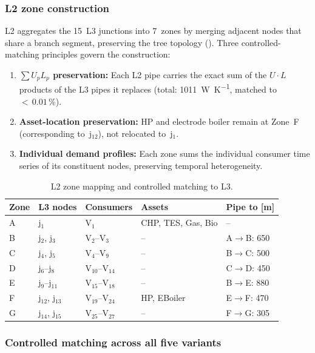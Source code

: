 \documentclass[review,3p]{elsarticle}
\begin{document}
\subsubsection{L2 zone construction}
\label{sec:case_l2_zones}

L2 aggregates the 15~L3 junctions into 7~zones by merging adjacent
nodes that share a branch segment, preserving the tree topology
(). Three controlled-matching principles govern
the construction:
%
\begin{enumerate}[nosep]
  \item \textbf{$\sum U_p L_p$ preservation:} Each L2 pipe carries
        the exact sum of the $U \cdot L$ products of the L3 pipes it
        replaces (total: \SI{1011}{\watt\per\kelvin}, matched to
        ${<}\,0.01\,\%$).
  \item \textbf{Asset-location preservation:} HP and electrode boiler
        remain at Zone~F (corresponding to~j$_{12}$), not relocated
        to~j$_1$.
  \item \textbf{Individual demand profiles:} Each zone sums the
        individual consumer time series of its constituent nodes,
        preserving temporal heterogeneity.
\end{enumerate}

\begin{table}[htbp]
\centering
\caption{L2 zone mapping and controlled matching to L3.}
\label{tab:l2_zones}
\small
\begin{tabular}{@{} l l l l l @{}}
\toprule
Zone & L3 nodes & Consumers & Assets & Pipe to [m] \\
\midrule
A & j$_1$          & V$_1$              & CHP, TES, Gas, Bio & -- \\
B & j$_2$, j$_3$   & V$_2$--V$_3$       & --       & A$\to$B: 650 \\
C & j$_4$, j$_5$   & V$_4$--V$_9$       & --       & B$\to$C: 500 \\
D & j$_6$--j$_8$   & V$_{10}$--V$_{14}$ & --       & C$\to$D: 450 \\
E & j$_9$--j$_{11}$& V$_{15}$--V$_{18}$ & --       & B$\to$E: 880 \\
F & j$_{12}$, j$_{13}$ & V$_{19}$--V$_{24}$ & HP, EBoiler
  & E$\to$F: 470 \\
G & j$_{14}$, j$_{15}$ & V$_{25}$--V$_{27}$ & --
  & F$\to$G: 305 \\
\bottomrule
\end{tabular}
\end{table}

\subsubsection{Controlled matching across all five variants}
\label{sec:case_matching}
\end{document}
